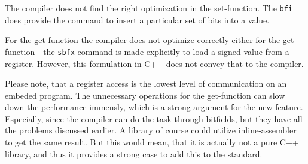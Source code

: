 \documentclass{scrreprt}
\begin{document}
The compiler does not find the right
optimization in the set-function. The \lstinline {bfi} does provide the
command to insert a particular set of bits into a value.

For the get function the compiler does not optimize correctly either for the get
function - the \lstinline {sbfx} command is made explicitly to load a signed
value from a register. However, this formulation in C++ does not convey that to
the compiler.

Please note, that a register access is the lowest level of communication on an
embeded program. The unnecessary operations for the get-function can slow down
the performance immensly, which is a strong argument for the new feature.
Especially, since the compiler can do the task through bitfields, but they have
all the problems discussed earlier. A library of course could utilize inline-assembler to get the same result. But
this would mean, that it is actually not a pure C++ library, and thus it
provides a strong case to add this to the standard.

%
 
\end{document}
